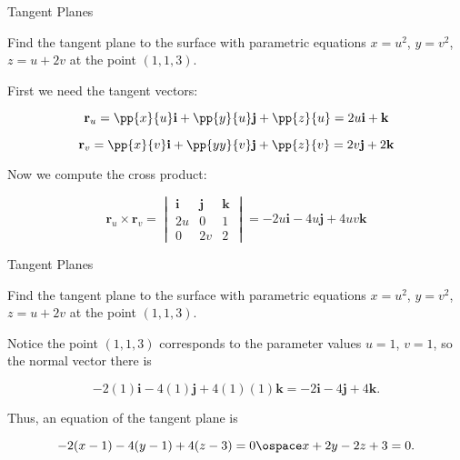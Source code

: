 \documentclass[11pt,english,
handout
]{beamer}
\begin{document}
\begin{frame}[t]{Tangent Planes}
\small
\begin{example}
Find the tangent plane to the surface with parametric equations $x=u^2$, $y=v^2$, $z=u+2v$ at the point $(1,1,3)$.\pause

\lspace
First we need the tangent vectors:

\[
\mathbf{r}_u=\pp{x}{u}\mathbf{i}+\pp{y}{u}\mathbf{j}+\pp{z}{u}=2u\mathbf{i}+\mathbf{k}
\]

\[
\mathbf{r}_v=\pp{x}{v}\mathbf{i}+\pp{yy}{v}\mathbf{j}+\pp{z}{v}=2v\mathbf{j}+2\mathbf{k}
\]\pause

Now we compute the cross product:

\[
\mathbf{r}_u\times\mathbf{r}_v=\begin{vmatrix}\mathbf{i}&\mathbf{j}&\mathbf{k}\\[2mm] 2u & 0 & 1 \\[2mm]0 & 2v & 2\end{vmatrix}=-2u\mathbf{i}-4u\mathbf{j}+4uv\mathbf{k}
\]
\end{example}
\end{frame}









\begin{frame}[t]{Tangent Planes}
\small
\begin{example}
Find the tangent plane to the surface with parametric equations $x=u^2$, $y=v^2$, $z=u+2v$ at the point $(1,1,3)$.

\lspace
Notice the point $(1,1,3)$ corresponds to the parameter values $u=1$, $v=1$, so the normal vector there is

\[
-2(1)\mathbf{i}-4(1)\mathbf{j}+4(1)(1)\mathbf{k}=-2\mathbf{i}-4\mathbf{j}+4\mathbf{k}.
\]\pause

Thus, an equation of the tangent plane is

\[
-2(x-1)-4(y-1)+4(z-3)=0\ospace x+2y-2z+3=0.
\]
\end{example}
\end{frame}
\end{document}
